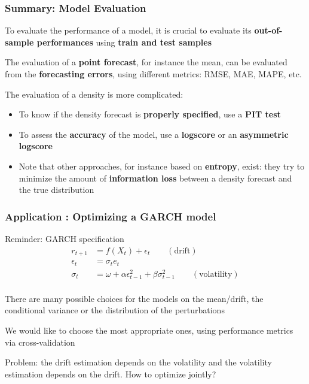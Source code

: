 \documentclass{beamer}
\newenvironment{wideitemize}{\itemize\addtolength{\itemsep}{10pt}}{\enditemize}
\begin{document}
\begin{frame}
  \frametitle{Summary: Model Evaluation}
  \begin{wideitemize}
    \item To evaluate the performance of a model, it is crucial to evaluate its \textbf{out-of-sample performances} using \textbf{train and test samples}
    \item The evaluation of a \textbf{point forecast}, for instance the mean, can be evaluated from the \textbf{forecasting errors}, using different metrics: RMSE, MAE, MAPE, etc.
    \item The evaluation of a density is more complicated:
      \begin{itemize}
      \item To know if the density forecast is \textbf{properly specified}, use a \textbf{PIT test}
      \item To assess the \textbf{accuracy} of the model, use a \textbf{logscore} or an \textbf{asymmetric logscore}
      \item Note that other approaches, for instance based on \textbf{entropy}, exist: they try to minimize the amount of \textbf{information loss} between a density forecast and the true distribution
      \end{itemize}
  \end{wideitemize}

  
\end{frame}



\begin{frame}
  \frametitle{Application : Optimizing a GARCH model}

  \begin{block}{Reminder: GARCH specification}
    \begin{equation*}
      \begin{split}
        r_{t+1} & = f(X_t) + \epsilon_t \qquad (\text{drift})\\
        \epsilon_t & = \sigma_t e_t \\
        \sigma_t & = \omega + \alpha \epsilon^2_{t-1} + \beta \sigma^2_{t-1} \qquad (\text{volatility})\\
      \end{split}
    \end{equation*}    
  \end{block}

  \begin{wideitemize}
    \item There are many possible choices for the models on the mean/drift, the conditional variance or the distribution of the perturbations
    \item We would like to choose the most appropriate ones, using performance metrics via cross-validation
    \item Problem: the drift estimation depends on the volatility and the volatility estimation depends on the drift. How to optimize jointly?
  \end{wideitemize}  
\end{frame}
\end{document}

